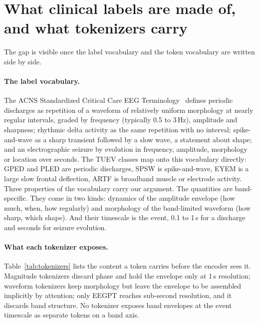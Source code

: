 \section{What clinical labels are made of, and what tokenizers carry}
\label{sec:background}

The gap is visible once the label vocabulary and the token vocabulary are written side by side.

\paragraph{The label vocabulary.}
The ACNS Standardized Critical Care EEG Terminology~\cite{hirsch2021acns} defines periodic discharges as repetition of a waveform of relatively uniform morphology at nearly regular intervals, graded by frequency (typically 0.5 to 3\,Hz), amplitude and sharpness; rhythmic delta activity as the same repetition with no interval; spike-and-wave as a sharp transient followed by a slow wave, a statement about shape; and an electrographic seizure by evolution in frequency, amplitude, morphology or location over seconds. The TUEV classes map onto this vocabulary directly: GPED and PLED are periodic discharges, SPSW is spike-and-wave, EYEM is a large slow frontal deflection, ARTF is broadband muscle or electrode activity. Three properties of the vocabulary carry our argument. The quantities are band-specific. They come in two kinds: dynamics of the amplitude envelope (how much, when, how regularly) and morphology of the band-limited waveform (how sharp, which shape). And their timescale is the event, 0.1 to 1\,s for a discharge and seconds for seizure evolution.

\paragraph{What each tokenizer exposes.}
Table~\ref{tab:tokenizers} lists the content a token carries before the encoder sees it. Magnitude tokenizers discard phase and hold the envelope only at 1\,s resolution; waveform tokenizers keep morphology but leave the envelope to be assembled implicitly by attention; only EEGPT reaches sub-second resolution, and it discards band structure. No tokenizer exposes band envelopes at the event timescale as separate tokens on a band axis.

